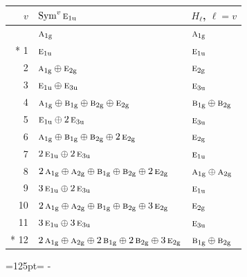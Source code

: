 \documentclass[10pt,a4paper]{article}
\newcommand{\needspace}[1]{\par\penalty-100\begingroup\dimen0=#1\relax\dimen2=\pagegoal
  \advance\dimen2-\pagetotal\ifdim\dimen0>\dimen2\relax\ifdim\dimen2>0pt\vfil\break\fi\fi
  \endgroup}
\numberwithin{equation}{section}
\newcommand{\irr}[1]{\text{\normalfont\scshape #1}}
\newcommand{\ptag}[1]{\mathrm{#1}}
\begin{document}
{\small\begin{longtable}{@{}rll@{}}\toprule
$v$ & $\operatorname{Sym}^{v}\irr{e}_{1\ptag{u}}$ & $H_\ell$, $\ell = v$\\\midrule\endhead
\bottomrule\endfoot\endlastfoot
0 & $\irr{a}_{1\ptag{g}}$ & $\irr{a}_{1\ptag{g}}$\\*
1 & $\irr{e}_{1\ptag{u}}$ & $\irr{e}_{1\ptag{u}}$\\
2 & $\irr{a}_{1\ptag{g}} \oplus \irr{e}_{2\ptag{g}}$ & $\irr{e}_{2\ptag{g}}$\\
3 & $\irr{e}_{1\ptag{u}} \oplus \irr{e}_{3\ptag{u}}$ & $\irr{e}_{3\ptag{u}}$\\
4 & $\irr{a}_{1\ptag{g}} \oplus \irr{b}_{1\ptag{g}} \oplus \irr{b}_{2\ptag{g}} \oplus \irr{e}_{2\ptag{g}}$ & $\irr{b}_{1\ptag{g}} \oplus \irr{b}_{2\ptag{g}}$\\
5 & $\irr{e}_{1\ptag{u}} \oplus 2\,\irr{e}_{3\ptag{u}}$ & $\irr{e}_{3\ptag{u}}$\\
6 & $\irr{a}_{1\ptag{g}} \oplus \irr{b}_{1\ptag{g}} \oplus \irr{b}_{2\ptag{g}} \oplus 2\,\irr{e}_{2\ptag{g}}$ & $\irr{e}_{2\ptag{g}}$\\
7 & $2\,\irr{e}_{1\ptag{u}} \oplus 2\,\irr{e}_{3\ptag{u}}$ & $\irr{e}_{1\ptag{u}}$\\
8 & $2\,\irr{a}_{1\ptag{g}} \oplus \irr{a}_{2\ptag{g}} \oplus \irr{b}_{1\ptag{g}} \oplus \irr{b}_{2\ptag{g}} \oplus 2\,\irr{e}_{2\ptag{g}}$ & $\irr{a}_{1\ptag{g}} \oplus \irr{a}_{2\ptag{g}}$\\
9 & $3\,\irr{e}_{1\ptag{u}} \oplus 2\,\irr{e}_{3\ptag{u}}$ & $\irr{e}_{1\ptag{u}}$\\
10 & $2\,\irr{a}_{1\ptag{g}} \oplus \irr{a}_{2\ptag{g}} \oplus \irr{b}_{1\ptag{g}} \oplus \irr{b}_{2\ptag{g}} \oplus 3\,\irr{e}_{2\ptag{g}}$ & $\irr{e}_{2\ptag{g}}$\\
11 & $3\,\irr{e}_{1\ptag{u}} \oplus 3\,\irr{e}_{3\ptag{u}}$ & $\irr{e}_{3\ptag{u}}$\\*
12 & $2\,\irr{a}_{1\ptag{g}} \oplus \irr{a}_{2\ptag{g}} \oplus 2\,\irr{b}_{1\ptag{g}} \oplus 2\,\irr{b}_{2\ptag{g}} \oplus 3\,\irr{e}_{2\ptag{g}}$ & $\irr{b}_{1\ptag{g}} \oplus \irr{b}_{2\ptag{g}}$\\
\bottomrule\end{longtable}}
\needspace{125pt}
\end{document}
